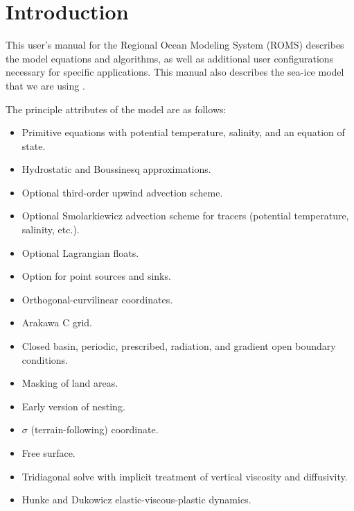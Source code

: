\setcounter{page}{1}
\section{Introduction}
\label{Intro}
This user's manual for the Regional Ocean Modeling System (ROMS)
describes the model equations and algorithms, as well as
additional user configurations necessary for specific applications.
This manual also describes the sea-ice model
that we are using \citep{Budgell05}.

The principle attributes of the model are as follows:
\begin{klist}
 \mbox{}
\begin{itemize}
  \item Primitive equations with potential temperature, salinity, and an
equation of state.
  \item Hydrostatic and Boussinesq approximations.
  \item Optional third-order upwind advection scheme.
  \item Optional Smolarkiewicz advection scheme for tracers
    (potential temperature, salinity, etc.).
  \item Optional Lagrangian floats.
  \item Option for point sources and sinks.
\end {itemize}
 \mbox{}
\begin{itemize}
  \item Orthogonal-curvilinear coordinates.
  \item Arakawa C grid.
  \item Closed basin, periodic, prescribed, radiation, and
    gradient open boundary conditions.
  \item Masking of land areas.
  \item Early version of nesting.
\end {itemize}
 \mbox{}
\begin{itemize}
  \item $\sigma$ (terrain-following) coordinate.
  \item Free surface.
  \item Tridiagonal solve with implicit treatment of vertical
    viscosity and diffusivity.
\end {itemize}
 \mbox{}
\begin{itemize}
  \item Hunke and Dukowicz elastic-viscous-plastic dynamics.

\end{itemize}
\end{klist}
